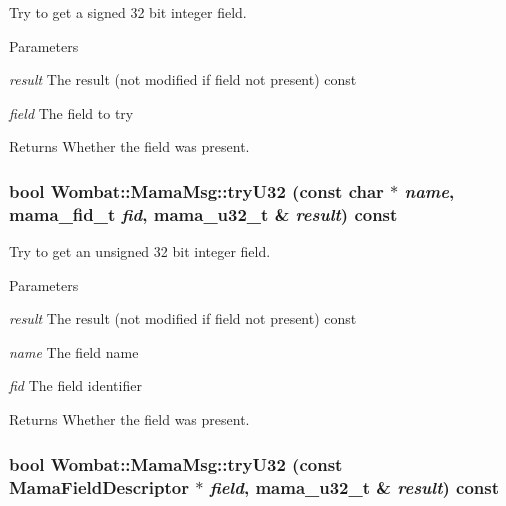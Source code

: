 Try to get a signed 32 bit integer field. 
\begin{DoxyParams}{Parameters}
\item[{\em result}]The result (not modified if field not present) const \item[{\em field}]The field to try \end{DoxyParams}
\begin{DoxyReturn}{Returns}
Whether the field was present. 
\end{DoxyReturn}
\hypertarget{classWombat_1_1MamaMsg_a38119970c0f4c3caa9f12f68a3ec0a82}{
\subsubsection[{tryU32}]{\setlength{\rightskip}{0pt plus 5cm}bool Wombat::MamaMsg::tryU32 (const char $\ast$ {\em name}, \/  mama\_\-fid\_\-t {\em fid}, \/  mama\_\-u32\_\-t \& {\em result}) const}}
\label{classWombat_1_1MamaMsg_a38119970c0f4c3caa9f12f68a3ec0a82}


Try to get an unsigned 32 bit integer field. 
\begin{DoxyParams}{Parameters}
\item[{\em result}]The result (not modified if field not present) const \item[{\em name}]The field name \item[{\em fid}]The field identifier \end{DoxyParams}
\begin{DoxyReturn}{Returns}
Whether the field was present. 
\end{DoxyReturn}
\hypertarget{classWombat_1_1MamaMsg_acad5bf883bc14323cd8896bde4e50f92}{
\subsubsection[{tryU32}]{\setlength{\rightskip}{0pt plus 5cm}bool Wombat::MamaMsg::tryU32 (const {\bf MamaFieldDescriptor} $\ast$ {\em field}, \/  mama\_\-u32\_\-t \& {\em result}) const}}
\label{classWombat_1_1MamaMsg_acad5bf883bc14323cd8896bde4e50f92}


